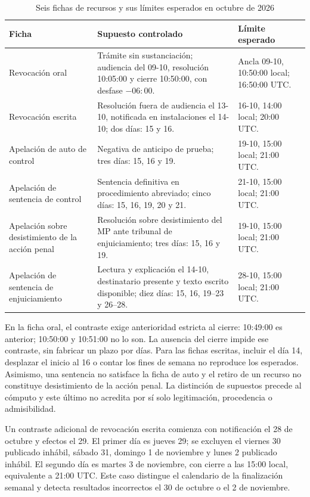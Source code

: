 \begin{table}[htbp]
  \centering
  
  \caption{Seis fichas de recursos y sus límites esperados en octubre de 2026}
  \label{tab:corpus-recursos}
  \begin{tabularx}{\linewidth}{@{}L{3.0cm} X L{3.0cm}@{}}
    \toprule
    Ficha & Supuesto controlado & Límite esperado \\
    \midrule
    Revocación oral & Trámite sin sustanciación; audiencia del 09-10, resolución 10:05:00 y cierre 10:50:00, con desfase $-06{:}00$. & Ancla 09-10, 10:50:00 local; 16:50:00 UTC. \\
    \addlinespace
    Revocación escrita & Resolución fuera de audiencia el 13-10, notificada en instalaciones el 14-10; dos días: 15 y 16. & 16-10, 14:00 local; 20:00 UTC. \\
    \addlinespace
    Apelación de auto de control & Negativa de anticipo de prueba; tres días: 15, 16 y 19. & 19-10, 15:00 local; 21:00 UTC. \\
    \addlinespace
    Apelación de sentencia de control & Sentencia definitiva en procedimiento abreviado; cinco días: 15, 16, 19, 20 y 21. & 21-10, 15:00 local; 21:00 UTC. \\
    \addlinespace
    Apelación sobre desistimiento de la acción penal & Resolución sobre desistimiento del MP ante tribunal de enjuiciamiento; tres días: 15, 16 y 19. & 19-10, 15:00 local; 21:00 UTC. \\
    \addlinespace
    Apelación de sentencia de enjuiciamiento & Lectura y explicación el 14-10, destinatario presente y texto escrito disponible; diez días: 15, 16, 19--23 y 26--28. & 28-10, 15:00 local; 21:00 UTC. \\
    \bottomrule
  \end{tabularx}
\end{table}

En la ficha oral, el contraste exige anterioridad estricta al cierre: 10:49:00 es anterior; 10:50:00 y 10:51:00 no lo son. La ausencia del cierre impide ese contraste, sin fabricar un plazo por días. Para las fichas escritas, incluir el día 14, desplazar el inicio al 16 o contar los fines de semana no reproduce los esperados. Asimismo, una sentencia no satisface la ficha de auto y el retiro de un recurso no constituye desistimiento de la acción penal. La distinción de supuestos precede al cómputo y este último no acredita por sí solo legitimación, procedencia o admisibilidad.

Un contraste adicional de revocación escrita comienza con notificación el 28 de octubre y efectos el 29. El primer día es jueves 29; se excluyen el viernes 30 publicado inhábil, sábado 31, domingo 1 de noviembre y lunes 2 publicado inhábil. El segundo día es martes 3 de noviembre, con cierre a las 15:00 local, equivalente a 21:00 UTC. Este caso distingue el calendario de la finalización semanal y detecta resultados incorrectos el 30 de octubre o el 2 de noviembre.


